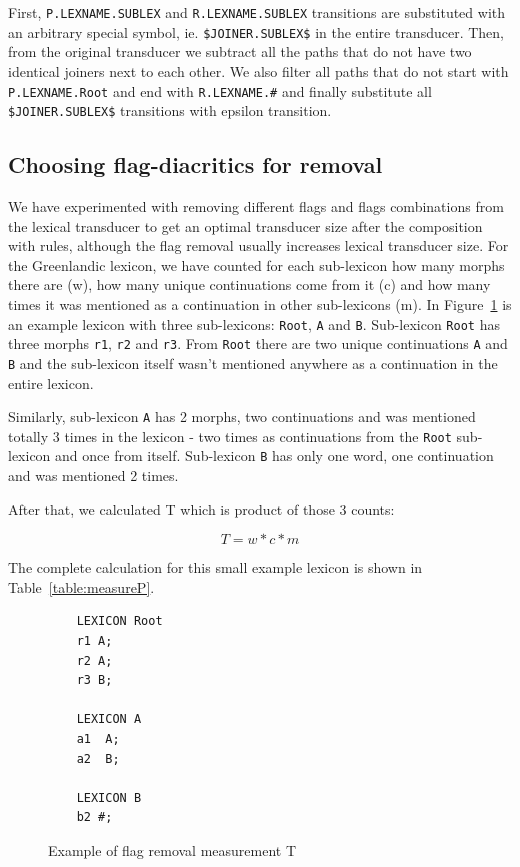 \documentclass[10pt, a4paper]{article}
\begin{document}
First, \verb+P.LEXNAME.SUBLEX+ and \verb+R.LEXNAME.SUBLEX+ transitions are substituted with an arbitrary special symbol, ie. 
\verb+$JOINER.SUBLEX$+ in the entire transducer. 
Then, from the original transducer we subtract all the paths that do not have two identical joiners next to each other. We also filter all paths that 
do not start with \verb+P.LEXNAME.Root+ and end with \verb+R.LEXNAME.#+ and finally substitute all \verb+$JOINER.SUBLEX$+ transitions with epsilon transition.

\subsection{Choosing flag-diacritics for removal}
\label{optimisation}

We have experimented with removing different flags and flags combinations from the lexical transducer 
to get an optimal transducer size after the composition with rules, although the flag removal usually increases lexical transducer size. 
For the Greenlandic lexicon, we have counted 
for each sub-lexicon how many morphs there are (w), how many unique continuations come from it (c) and how many times it 
was mentioned as a continuation in other sub-lexicons (m). In Figure~\ref{fig:lexc-measures} is an example lexicon 
with three sub-lexicons: \verb+Root+, \verb+A+ and \verb+B+. Sub-lexicon \verb+Root+ has three morphs \verb+r1+, \verb+r2+ and \verb+r3+. 
From \verb+Root+ there are two unique continuations \verb+A+ and \verb+B+ and the sub-lexicon itself wasn't mentioned anywhere as a continuation in the entire lexicon.

Similarly, sub-lexicon \verb+A+ has 2 morphs, two continuations and was mentioned totally 3 times in the lexicon - 
two times as continuations from the \verb+Root+ sub-lexicon and once from itself. Sub-lexicon \verb+B+ has only one word, one continuation and was mentioned 2 times. 

After that, we calculated T which is product of 
those 3 counts:

\begin{equation}\label{first}
T = w * c * m
\end{equation}


The complete calculation for this small example lexicon is shown in Table~\ref{table:measureP}.

\begin{figure}
\centering
\begin{verbatim}
    LEXICON Root
    r1 A;
    r2 A;
    r3 B;
    
    LEXICON A
    a1  A;
    a2  B;
    
    LEXICON B
    b2 #;
    \end{verbatim}
  
    \caption{Example of flag removal measurement T
    \label{fig:lexc-measures}}
\end{figure}
\end{document}
